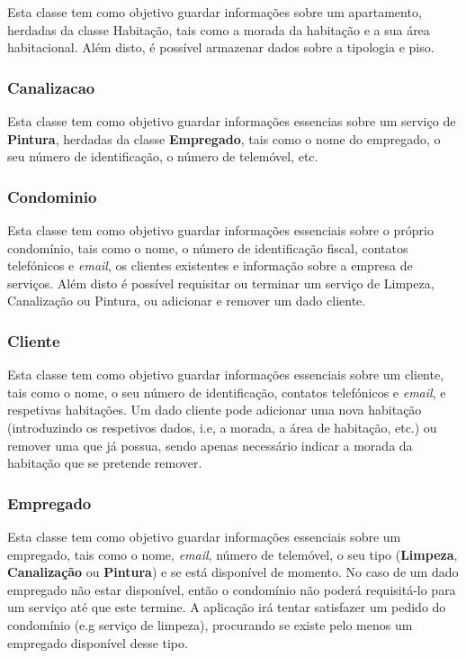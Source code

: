 \documentclass[a4paper]{article}
\begin{document}
Esta classe tem como objetivo guardar informações sobre um apartamento, herdadas da classe Habitação, tais como a morada da habitação e a sua área habitacional. Além disto, é possível armazenar dados sobre a tipologia e piso.

\subsubsection{Canalizacao}

Esta classe tem como objetivo guardar informações essencias sobre um serviço de \textbf{Pintura}, herdadas da classe \textbf{Empregado}, tais como o nome do empregado, o seu número de identificação, o número de telemóvel, etc.

\subsubsection{Condominio}

Esta classe tem como objetivo guardar informações essenciais sobre o próprio condomínio, tais como o nome, o número de identificação fiscal, contatos telefónicos e \textit{email}, os clientes existentes e informação sobre a empresa de serviços. Além disto é possível requisitar ou terminar um serviço de Limpeza, Canalização ou Pintura, ou adicionar e remover um dado cliente.

\subsubsection{Cliente}

Esta classe tem como objetivo guardar informações essenciais sobre um cliente, tais como o nome, o seu número de identificação, contatos telefónicos e \textit{email}, e respetivas habitações. Um dado cliente pode adicionar uma nova habitação (introduzindo os respetivos dados, i.e, a morada, a área de habitação, etc.) ou remover uma que já possua, sendo apenas necessário indicar a morada da habitação que se pretende remover.

\subsubsection{Empregado}

Esta classe tem como objetivo guardar informações essenciais sobre um empregado, tais como o nome, \textit{email}, número de telemóvel, o seu tipo (\textbf{Limpeza}, \textbf{Canalização} ou \textbf{Pintura}) e se está disponível de momento. No caso de um dado empregado não estar disponível, então o condomínio não poderá requisitá-lo para um serviço até que este termine. A aplicação irá tentar satisfazer um pedido do condomínio (e.g serviço de limpeza), procurando se existe pelo menos um empregado disponível desse tipo.
\end{document}
